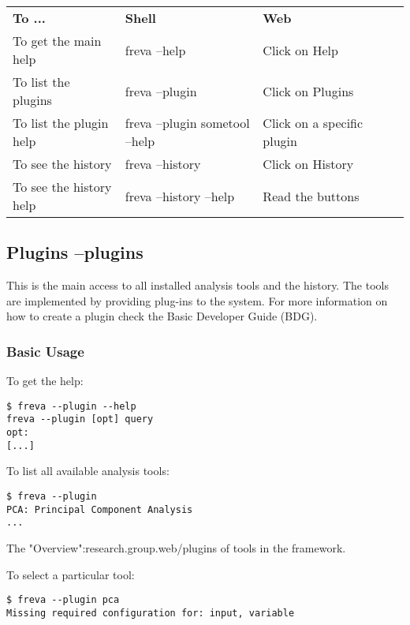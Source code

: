 \documentclass[a4paper,11pt]{ltxdoc}
\begin{document}
\begin{tabular}{lllll}
\cline{1-1}
\multicolumn{1}{|l|}{\textbf{To ... } }  & \multicolumn{1}{|l|}{\textbf{Shell}} & \multicolumn{1}{|l|}{\textbf{Web}} \\ 
\multicolumn{1}{|l|}{To get the main help }  & \multicolumn{1}{|l|}{freva --help} & \multicolumn{1}{|l|}{Click on Help} \\ 
\multicolumn{1}{|l|}{To list the plugins }  & \multicolumn{1}{|l|}{freva --plugin} &  \multicolumn{1}{|l|}{Click on Plugins} \\
\multicolumn{1}{|l|}{To list the plugin help }  & \multicolumn{1}{|l|}{freva --plugin sometool --help} &  \multicolumn{1}{|l|}{Click on a specific plugin} \\
\multicolumn{1}{|l|}{To see the history }  & \multicolumn{1}{|l|}{freva --history} &  \multicolumn{1}{|l|}{Click on History} \\
\multicolumn{1}{|l|}{To see the history help }  & \multicolumn{1}{|l|}{freva --history --help} &  \multicolumn{1}{|l|}{Read the buttons} \\
\end{tabular}


\subsection{Plugins --plugins}

This is the main access to all installed analysis tools and the history. The tools are implemented by providing plug-ins to the system. For more information on how to create a plugin check the Basic Developer Guide (BDG). 

\subsubsection*{Basic Usage}

To get the help:
\begin{verbatim} 
$ freva --plugin --help
freva --plugin [opt] query 
opt:
[...]
\end{verbatim}
To list all available analysis tools:
\begin{verbatim} 
$ freva --plugin
PCA: Principal Component Analysis
...
\end{verbatim}
The "Overview":research.group.web/plugins of tools in the framework.

To select a particular tool:
\begin{verbatim}
$ freva --plugin pca
Missing required configuration for: input, variable
\end{verbatim}
\end{document}
